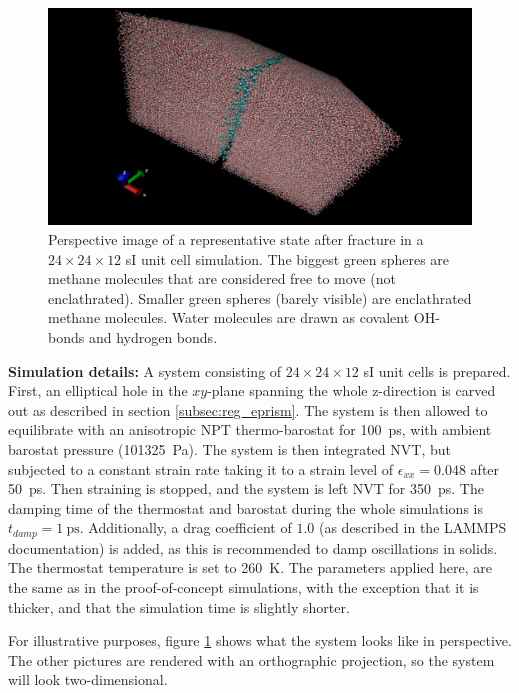 \begin{figure}
\includegraphics[width=\textwidth]{../pictures/system_1048.pdf}
\caption{Perspective image of a representative state after fracture in a $24\times 24 \times 12$ sI unit cell simulation. The biggest green spheres are methane molecules that are considered free to move (not enclathrated). Smaller green spheres (barely visible) are enclathrated methane molecules. Water molecules are drawn as covalent OH-bonds and hydrogen bonds.}
\label{fig:system_1048}
\end{figure}

\begin{framed} 
\textbf{Simulation details:} A system consisting of $24 \times 24\times 12$ sI unit cells is prepared. First, an elliptical hole in the $xy$-plane spanning the whole z-direction is carved out as described in section \ref{subsec:reg_eprism}. The system is then allowed to equilibrate with an anisotropic NPT thermo-barostat for \SI{100}{\pico\second}, with ambient barostat pressure (\SI{101325}{\pascal}). The system is then integrated NVT, but subjected to a constant strain rate taking it to a strain level of $\epsilon_{xx} = 0.048$ after \SI{50}{\pico\second}. Then straining is stopped, and the system is left NVT for \SI{350}{\pico\second}. The damping time of the thermostat and barostat during the whole simulations is $t_{damp} = \SI{1}{\ps}$. Additionally, a drag coefficient of $1.0$ (as described in the LAMMPS documentation) is added, as this is recommended to damp oscillations in solids. The thermostat temperature is set to \SI{260}{\kelvin}. The parameters applied here, are the same as in the proof-of-concept simulations, with the exception that it is thicker, and that the simulation time is slightly shorter.
\end{framed}

For illustrative purposes, figure \ref{fig:system_1048} shows what the system looks like in perspective. The other pictures are rendered with an orthographic projection, so the system will look two-dimensional. 

